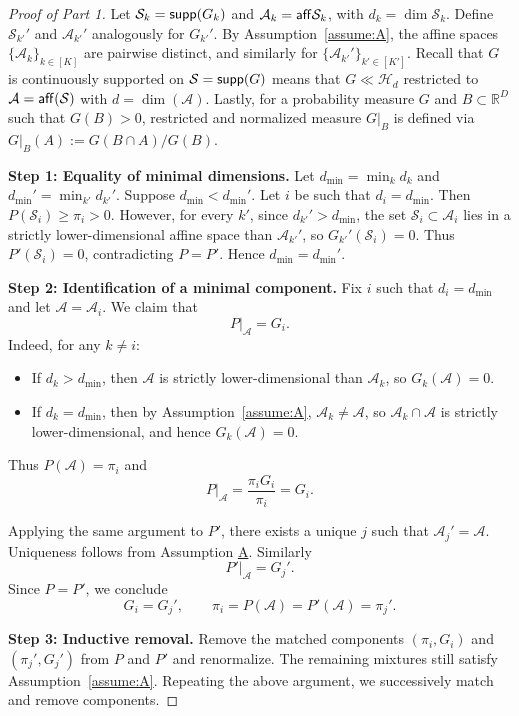 \documentclass[bj,authoryear]{imsart}
\theoremstyle{plain}
\theoremstyle{remark}
\def\aff{{\sf aff}}
\def\bbR{\mathbb{R}}
\def\cA{\mathcal{A}}
\def\cH{\mathcal{H}}
\def\cS{\mathcal{S}}
\def\supp{{\sf supp}}
\begin{document}
\begin{appendix}
\begin{proof}[Proof of Part 1]
Let $\cS_k = \supp(G_k)$ and $\cA_k = \aff \cS_k$, with $d_k = \dim \cS_k$. Define $\cS_{k'}'$ and $\cA_{k'}'$ analogously for $G_{k'}'$. By Assumption~\ref{assume:A}, the affine spaces $\{\cA_k\}_{k\in[K]}$ are pairwise distinct, and similarly for $\{\cA_{k'}'\}_{k'\in[K']}$. Recall that $G$ is continuously supported on $\cS=\supp(G)$ means that $G\ll \cH_d$ restricted to $\cA=\aff(\cS)$ with $d=\dim(\cA)$. Lastly, for a probability measure $G$ and $B\subset \bbR^D$ such that $G(B)>0$, restricted and normalized measure $G|_{B}$ is defined via $G|_{B}(A):=G(B\cap A)/G(B)$.

\medskip

\noindent
\textbf{Step 1: Equality of minimal dimensions.}
Let $d_{\min} = \min_k d_k$ and $d_{\min}' = \min_{k'} d_{k'}'$. Suppose $d_{\min} < d_{\min}'$. Let $i$ be such that $d_i = d_{\min}$. Then $P(\cS_i) \ge \pi_i > 0$. However, for every $k'$, since $d_{k'}' > d_{\min}$, the set $\cS_i \subset \cA_i$ lies in a strictly lower-dimensional affine space than $\cA_{k'}'$, so $G_{k'}'(\cS_i)=0$. Thus $P'(\cS_i)=0$, contradicting $P=P'$. Hence $d_{\min} = d_{\min}'$.

\medskip

\noindent
\textbf{Step 2: Identification of a minimal component.}
Fix $i$ such that $d_i = d_{\min}$ and let $\cA = \cA_i$. We claim that
\[
P|_{\cA} = G_i.
\]
Indeed, for any $k \neq i$:
\begin{itemize}
    \item If $d_k > d_{\min}$, then $\cA$ is strictly lower-dimensional than $\cA_k$, so $G_k(\cA)=0$.
    \item If $d_k = d_{\min}$, then by Assumption~\ref{assume:A}, $\cA_k \neq \cA$, so $\cA_k \cap \cA$ is strictly lower-dimensional, and hence $G_k(\cA)=0$.
\end{itemize}
Thus $P(\cA) = \pi_i$ and
\[
P|_{\cA} = \frac{\pi_i G_i}{\pi_i} = G_i.
\]

Applying the same argument to $P'$, there exists a unique $j$ such that $\cA_j' = \cA$. Uniqueness follows from Assumption \hyperref[assume:A]{A}. Similarly
\[
P'|_{\cA} = G_j'.
\]
Since $P=P'$, we conclude
\[
G_i = G_j', \qquad \pi_i = P(\cA) = P'(\cA) = \pi_j'.
\]

\medskip

\noindent
\textbf{Step 3: Inductive removal.}
Remove the matched components $(\pi_i, G_i)$ and $(\pi_j', G_j')$ from $P$ and $P'$ and renormalize. The remaining mixtures still satisfy Assumption~\ref{assume:A}. Repeating the above argument, we successively match and remove components.


\end{proof}
\end{appendix}
\end{document}
